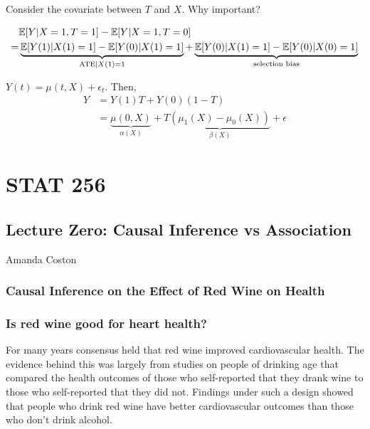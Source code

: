 \documentclass[11pt]{elegantbook}
\begin{document}
Consider the covariate between $T$ and $X$. Why important?

\begin{equation}
    \begin{aligned}
        &\mathbb{E}[Y|X=1,T=1]-\mathbb{E}[Y|X=1,T=0]\\
        =& \underbrace{\mathbb{E}[Y(1)|X(1)=1]-\mathbb{E}[Y(0)|X(1)=1]}_{\textnormal{ATE}|X(1)=1} + \underbrace{\mathbb{E}[Y(0)|X(1)=1]-\mathbb{E}[Y(0)|X(0)=1]}_{\textnormal{selection bias}}\\
    \end{aligned}
    \nonumber
\end{equation}


$Y(t)=\mu(t,X)+\epsilon_t$. Then,
\begin{equation}
    \begin{aligned}
        Y&=Y(1)T+Y(0)(1-T)\\
        &=\underbrace{\mu(0,X)}_{\alpha(X)} + T\underbrace{(\mu_1(X)-\mu_0(X))}_{\beta(X)}+\epsilon
    \end{aligned}
    \nonumber
\end{equation}



\chapter{STAT 256}
\section{Lecture Zero: Causal Inference vs Association}{Amanda Coston}

\subsection{Causal Inference on the Effect of Red Wine on Health}\label{sec:intro}

\subsection{Is red wine good for heart health?}
For many years consensus held that red wine improved cardiovascular health. The evidence behind this was largely from studies on people of drinking age that compared the health outcomes of those who self-reported that they drank wine to those who self-reported that they did not. Findings under such a design showed that people who drink  red wine have better cardiovascular outcomes than those who don't drink alcohol.
\end{document}
